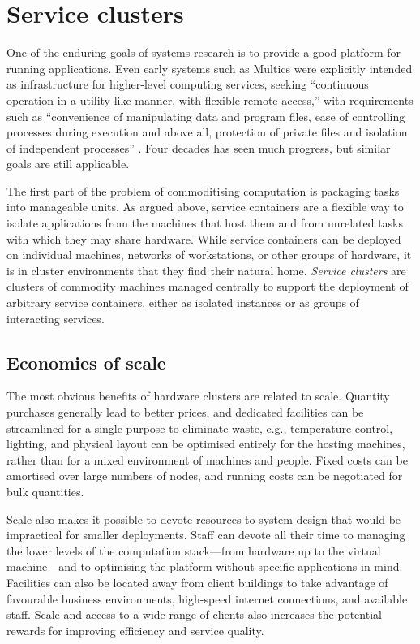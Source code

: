 \section{Service clusters}

One of the enduring goals of systems research is to provide a good platform for running applications. Even early systems such as Multics were explicitly intended as infrastructure for higher-level computing services, seeking ``continuous operation in a utility-like manner, with flexible remote access,'' with requirements such as ``convenience of manipulating data and program files, ease of controlling processes during execution and above all, protection of private files and isolation of independent processes'' \cite{corbato}. Four decades has seen much progress, but similar goals are still applicable.

The first part of the problem of commoditising computation is packaging tasks into manageable units. As argued above, service containers are a flexible way to isolate applications from the machines that host them and from unrelated tasks with which they may share hardware. While service containers can be deployed on individual machines, networks of workstations, or other groups of hardware, it is in cluster environments that they find their natural home. \emph{Service clusters} are clusters of commodity machines managed centrally to support the deployment of arbitrary service containers, either as isolated instances or as groups of interacting services.

\subsection{Economies of scale}

The most obvious benefits of hardware clusters are related to scale. Quantity purchases generally lead to better prices, and dedicated facilities can be streamlined for a single purpose to eliminate waste, e.g., temperature control, lighting, and physical layout can be optimised entirely for the hosting machines, rather than for a mixed environment of machines and people. Fixed costs can be amortised over large numbers of nodes, and running costs can be negotiated for bulk quantities.

Scale also makes it possible to devote resources to system design that would be impractical for smaller deployments. Staff can devote all their time to managing the lower levels of the computation stack---from hardware up to the virtual machine---and to optimising the platform without specific applications in mind. Facilities can also be located away from client buildings to take advantage of favourable business environments, high-speed internet connections, and available staff. Scale and access to a wide range of clients also increases the potential rewards for improving efficiency and service quality.

